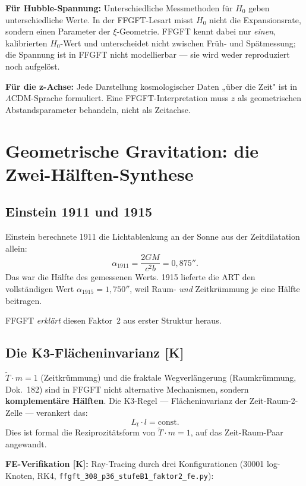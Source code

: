 \textbf{Für Hubble-Spannung:} Unterschiedliche Messmethoden für $H_0$
geben unterschiedliche Werte. In der FFGFT-Lesart misst $H_0$ nicht
die Expansionsrate, sondern einen Parameter der $\xi$-Geometrie. FFGFT
kennt dabei nur \emph{einen}, kalibrierten $H_0$-Wert und unterscheidet
nicht zwischen Früh- und Spätmessung; die Spannung ist in FFGFT nicht
modellierbar --- sie wird weder reproduziert noch aufgelöst.

\textbf{Für die z-Achse:} Jede Darstellung kosmologischer Daten „über
die Zeit" ist in $\Lambda$CDM-Sprache formuliert. Eine
FFGFT-Interpretation muss $z$ als geometrischen Abstandsparameter
behandeln, nicht als Zeitachse.

\chapter{Geometrische Gravitation: die Zwei-Hälften-Synthese}

\section{Einstein 1911 und 1915}

Einstein berechnete 1911 die Lichtablenkung an der Sonne aus der
Zeitdilatation allein:
\[
  \alpha_{1911} = \frac{2GM}{c^2 b} = 0{,}875'' .
\]
Das war die Hälfte des gemessenen Werts. 1915 lieferte die ART den
vollständigen Wert $\alpha_{1915} = 1{,}750''$, weil Raum- \emph{und}
Zeitkrümmung je eine Hälfte beitragen.

FFGFT \emph{erklärt} diesen Faktor~2 aus erster Struktur heraus.

\section{Die K3-Flächeninvarianz [K]}

$\tilde T \cdot m = 1$ (Zeitkrümmung) und die fraktale Wegverlängerung
(Raumkrümmung, Dok.~182) sind in FFGFT nicht alternative Mechanismen,
sondern \textbf{komplementäre Hälften}. Die K3-Regel — Flächeninvarianz
der Zeit-Raum-2-Zelle — verankert das:
\[
  L_t \cdot l = \text{const.}
\]
Dies ist formal die Reziprozitätsform von $\tilde T \cdot m = 1$, auf das
Zeit-Raum-Paar angewandt.

\textbf{FE-Verifikation [K]:} Ray-Tracing durch drei Konfigurationen
(30001 log-Knoten, RK4,
\texttt{ffgft\_308\_p36\_stufeB1\_faktor2\_fe.py}):

